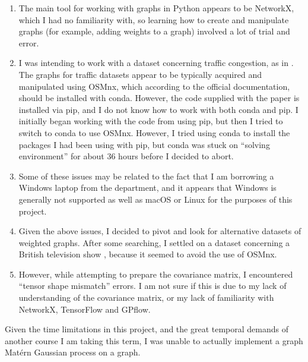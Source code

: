 \begin{enumerate}
    \item The main tool for working with graphs in Python appears to be NetworkX, which I had no familiarity with, so learning how to create and manipulate graphs (for example, adding weights to a graph) involved a lot of trial and error.
    \item I was intending to work with a dataset concerning traffic congestion, as in \cite{pmlr-v130-borovitskiy21a}. The graphs for traffic datasets appear to be typically acquired and manipulated using OSMnx, which according to the official documentation, should be installed with conda. However, the code supplied with the paper \cite{pmlr-v130-borovitskiy21a} is installed via pip, and I do not know how to work with both conda and pip. I initially began working with the code from \cite{pmlr-v130-borovitskiy21a} using pip, but then I tried to switch to conda to use OSMnx. However, I tried using conda to install the packages I had been using with pip, but conda was stuck on ``solving environment'' for about 36 hours before I decided to abort.
    \item Some of these issues may be related to the fact that I am borrowing a Windows laptop from the department, and it appears that Windows is generally not supported as well as macOS or Linux for the purposes of this project.
    \item Given the above issues, I decided to pivot and look for alternative datasets of weighted graphs. After some searching, I settled on a dataset concerning a British television show \cite{docwho}, because it seemed to avoid the use of OSMnx.
    \item However, while attempting to prepare the covariance matrix, I encountered ``tensor shape mismatch'' errors. I am not sure if this is due to my lack of understanding of the covariance matrix, or my lack of familiarity with NetworkX, TensorFlow and GPflow.
\end{enumerate}

Given the time limitations in this project, and the great temporal demands of another course I am taking this term, I was unable to actually implement a graph Mat\'{e}rn Gaussian process on a graph.


